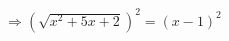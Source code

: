 \documentclass[preview]{standalone}
\begin{document}
\begin{align*}
\Rightarrow (\sqrt{x^2 + 5x + 2})^2 = (x - 1)^2
\end{align*}
\end{document}
